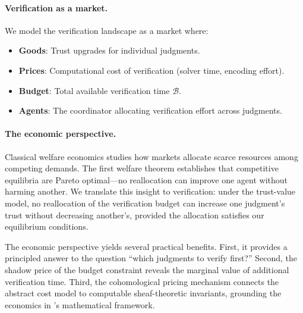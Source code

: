 \documentclass[11pt]{article}
\newcommand{\VerifBudget}{\mathcal{B}}
\begin{document}
\paragraph{Verification as a market.}
We model the verification landscape as a market where:
\begin{itemize}[noitemsep]
  \item \textbf{Goods}: Trust upgrades for individual judgments.
  \item \textbf{Prices}: Computational cost of verification
        (solver time, encoding effort).
  \item \textbf{Budget}: Total available verification time
        $\VerifBudget$.
  \item \textbf{Agents}: The coordinator allocating verification
        effort across judgments.
\end{itemize}

\paragraph{The economic perspective.}
Classical welfare economics studies how markets allocate scarce resources
among competing demands.  The first welfare theorem establishes that
competitive equilibria are Pareto optimal---no reallocation can improve
one agent without harming another.  We translate this insight to
verification: under the trust-value model, no reallocation of the
verification budget can increase one judgment's trust without decreasing
another's, provided the allocation satisfies our equilibrium conditions.

The economic perspective yields several practical benefits.  First,
it provides a principled answer to the question ``which judgments to
verify first?''  Second, the shadow price of the budget constraint
reveals the marginal value of additional verification time.  Third,
the cohomological pricing mechanism connects the abstract cost model
to computable sheaf-theoretic invariants, grounding the economics in
\JuGeo's mathematical framework.
\end{document}
